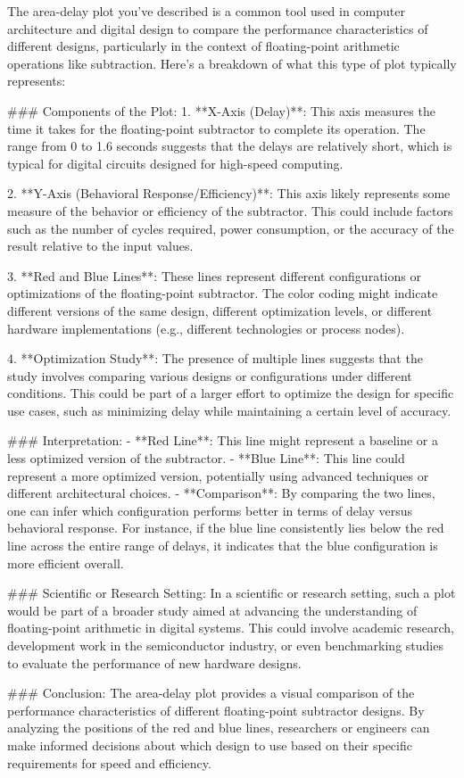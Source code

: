 The area-delay plot you've described is a common tool used in computer architecture and digital design to compare the performance characteristics of different designs, particularly in the context of floating-point arithmetic operations like subtraction. Here's a breakdown of what this type of plot typically represents:

### Components of the Plot:
1. **X-Axis (Delay)**: This axis measures the time it takes for the floating-point subtractor to complete its operation. The range from 0 to 1.6 seconds suggests that the delays are relatively short, which is typical for digital circuits designed for high-speed computing.

2. **Y-Axis (Behavioral Response/Efficiency)**: This axis likely represents some measure of the behavior or efficiency of the subtractor. This could include factors such as the number of cycles required, power consumption, or the accuracy of the result relative to the input values.

3. **Red and Blue Lines**: These lines represent different configurations or optimizations of the floating-point subtractor. The color coding might indicate different versions of the same design, different optimization levels, or different hardware implementations (e.g., different technologies or process nodes).

4. **Optimization Study**: The presence of multiple lines suggests that the study involves comparing various designs or configurations under different conditions. This could be part of a larger effort to optimize the design for specific use cases, such as minimizing delay while maintaining a certain level of accuracy.

### Interpretation:
- **Red Line**: This line might represent a baseline or a less optimized version of the subtractor.
- **Blue Line**: This line could represent a more optimized version, potentially using advanced techniques or different architectural choices.
- **Comparison**: By comparing the two lines, one can infer which configuration performs better in terms of delay versus behavioral response. For instance, if the blue line consistently lies below the red line across the entire range of delays, it indicates that the blue configuration is more efficient overall.

### Scientific or Research Setting:
In a scientific or research setting, such a plot would be part of a broader study aimed at advancing the understanding of floating-point arithmetic in digital systems. This could involve academic research, development work in the semiconductor industry, or even benchmarking studies to evaluate the performance of new hardware designs.

### Conclusion:
The area-delay plot provides a visual comparison of the performance characteristics of different floating-point subtractor designs. By analyzing the positions of the red and blue lines, researchers or engineers can make informed decisions about which design to use based on their specific requirements for speed and efficiency.